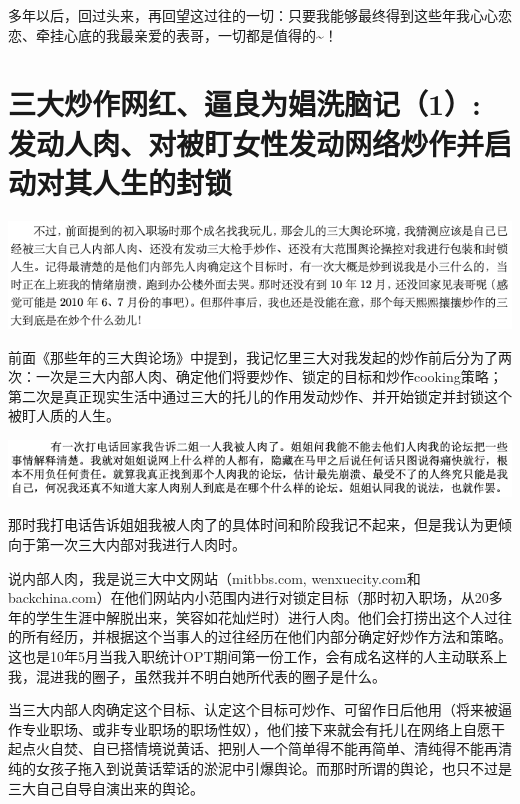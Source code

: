 \documentclass[9pt, b5paper]{article}
\begin{document}
多年以后，回过头来，再回望这过往的一切：只要我能够最终得到这些年我心心恋恋、牵挂心底的我最亲爱的表哥，一切都是值得的\textasciitilde{}！

\section{三大炒作网红、逼良为娼洗脑记（1）: 发动人肉、对被盯女性发动网络炒作并启动对其人生的封锁}
\label{sec:org2bc85f5}

\begin{center}
\includegraphics[width=.9\linewidth]{./pic/pfp60.png}
\end{center}

前面《那些年的三大舆论场》中提到，我记忆里三大对我发起的炒作前后分为了两次：一次是三大内部人肉、确定他们将要炒作、锁定的目标和炒作cooking策略；第二次是真正现实生活中通过三大的托儿的作用发动炒作、并开始锁定并封锁这个被盯人质的人生。

\begin{center}
\includegraphics[width=.9\linewidth]{./pic/p1p51-2.png}
\end{center}

那时我打电话告诉姐姐我被人肉了的具体时间和阶段我记不起来，但是我认为更倾向于第一次三大内部对我进行人肉时。

说内部人肉，我是说三大中文网站（mitbbs.com, wenxuecity.com和backchina.com）在他们网站内小范围内进行对锁定目标（那时初入职场，从20多年的学生生涯中解脱出来，笑容如花灿烂时）进行人肉。他们会打捞出这个人过往的所有经历，并根据这个当事人的过往经历在他们内部分确定好炒作方法和策略。这也是10年5月当我入职统计OPT期间第一份工作，会有成名这样的人主动联系上我，混进我的圈子，虽然我并不明白她所代表的圈子是什么。 

当三大内部人肉确定这个目标、认定这个目标可炒作、可留作日后他用（将来被逼作专业职场、或非专业职场的职场性奴），他们接下来就会有托儿在网络上自愿干起点火自焚、自已搭情境说黄话、把别人一个简单得不能再简单、清纯得不能再清纯的女孩子拖入到说黄话荤话的淤泥中引爆舆论。而那时所谓的舆论，也只不过是三大自己自导自演出来的舆论。
\end{document}
